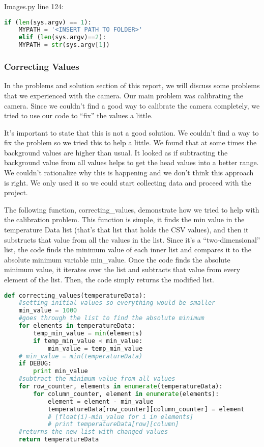 	Images.py line 124: 
	\begin{lstlisting}[language=Python, caption=Python example]
	if (len(sys.argv) == 1):
	MYPATH = '<INSERT PATH TO FOLDER>'
	elif (len(sys.argv)==2):
	MYPATH = str(sys.argv[1])
	\end{lstlisting}
	
\subsubsection*{Correcting Values}
	In the problems and solution section of this report, we will discuss some problems that we experienced with the camera. Our main problem was calibrating the camera. Since we couldn’t find a good way to calibrate the camera completely, we tried to use our code to “fix” the values a little. 
	
	It’s important to state that this is not a good solution. We couldn’t find a way to fix the problem so we tried this to help a little. We found that at some times the background values are higher than usual. It looked as if subtracting the background value from all values helps to get the head values into a better range. We couldn’t rationalize why this is happening and we don’t think this approach is right. We only used it so we could start collecting data and proceed with the project. 
	
	The following function, correcting\_values, demonstrate how we tried to help with the calibration problem. This function is simple, it finds the min value in the temperature Data list (that’s that list that holds the CSV values), and then it substructs that value from all the values in the list.  Since it’s a “two-dimensional” list, the code finds the minimum value of each inner list and compares it to the absolute minimum variable min\_value. Once the code finds the absolute minimum value, it iterates over the list and subtracts that value from every element of the list. Then, the code simply returns the modified list. 
	
\begin{lstlisting}[language=Python, caption=Python example]
	def correcting_values(temperatureData):
	#setting initial values so everything would be smaller
	min_value = 1000
	#goes through the list to find the absolute minimum
	for elements in temperatureData:
		temp_min_value = min(elements)
		if temp_min_value < min_value:
			min_value = temp_min_value
	# min_value = min(temperatureData)
	if DEBUG:
		print min_value
	#subtract the minimum value from all values
	for row_counter, elements in enumerate(temperatureData):
		for column_counter, element in enumerate(elements):
			element = element - min_value
			temperatureData[row_counter][column_counter] = element
			# [float(i)-min_value for i in elements]
			# print temperatureData[row][column]
	#returns the new list with changed values
	return temperatureData

\end{lstlisting}
	
